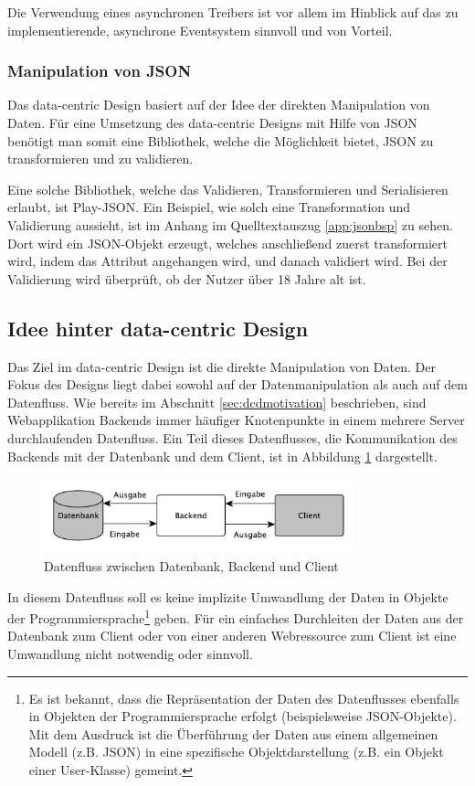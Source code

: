 Die Verwendung eines asynchronen Treibers ist vor allem im Hinblick auf das zu implementierende, asynchrone Eventsystem sinnvoll und von Vorteil. 

\subsubsection{Manipulation von JSON}
Das data-centric Design basiert auf der Idee der direkten Manipulation von Daten. Für eine Umsetzung des data-centric Designs mit Hilfe von JSON benötigt man somit eine Bibliothek, welche die Möglichkeit bietet, JSON zu transformieren und zu validieren.
 
Eine solche Bibliothek, welche das Validieren, Transformieren und Serialisieren erlaubt, ist Play-JSON. Ein Beispiel, wie solch eine Transformation und Validierung aussieht, ist im Anhang im Quelltextauszug \ref{app:jsonbsp} zu sehen. Dort wird ein JSON-Objekt erzeugt, welches anschließend zuerst transformiert wird, indem das Attribut  angehangen wird, und danach validiert wird. Bei der Validierung wird überprüft, ob der Nutzer über 18 Jahre alt ist.

\subsection{Idee hinter data-centric Design}
Das Ziel im data-centric Design ist die direkte Manipulation von Daten. Der Fokus des Designs liegt dabei sowohl auf der Datenmanipulation als auch auf dem Datenfluss. Wie bereits im Abschnitt \ref{sec:dcdmotivation} beschrieben, sind Webapplikation Backends immer häufiger Knotenpunkte in einem mehrere Server durchlaufenden Datenfluss. Ein Teil dieses Datenflusses, die Kommunikation des Backends mit der Datenbank und dem Client, ist in Abbildung \ref{fig:dataflow} dargestellt. 

\begin{figure}[h]   
  \centering     
  \includegraphics[width=0.8\textwidth]{img/dataflow_dcd.pdf}  
   \caption{Datenfluss zwischen Datenbank, Backend und Client}   
  \label{fig:dataflow} 
\end{figure}

In diesem Datenfluss soll es keine implizite Umwandlung der Daten in Objekte der Programmiersprache\footnote{Es ist bekannt, dass die Repräsentation der Daten des Datenflusses ebenfalls in Objekten der Programmiersprache erfolgt (beispielsweise JSON-Objekte). Mit dem Ausdruck ist die Überführung der Daten aus einem allgemeinen Modell (z.B. JSON) in eine spezifische Objektdarstellung (z.B. ein Objekt einer User-Klasse) gemeint.} geben. Für ein einfaches Durchleiten der Daten aus der Datenbank zum Client oder von einer anderen Webressource zum Client ist eine Umwandlung nicht notwendig oder sinnvoll. 

